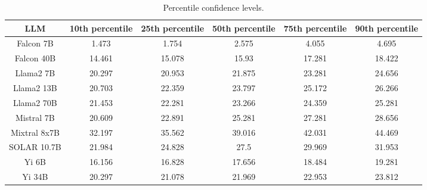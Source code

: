 \begin{table*}
\centering
\begin{tabular}{c|c|c|c|c|c}
LLM & 10th percentile & 25th percentile & 50th percentile & 75th percentile & 90th percentile\\ \hline
Falcon 7B & 1.473 & 1.754 & 2.575 & 4.055 & 4.695\\
Falcon 40B & 14.461 & 15.078 & 15.93 & 17.281 & 18.422\\
Llama2 7B & 20.297 & 20.953 & 21.875 & 23.281 & 24.656\\
Llama2 13B & 20.703 & 22.359 & 23.797 & 25.172 & 26.266\\
Llama2 70B & 21.453 & 22.281 & 23.266 & 24.359 & 25.281\\
Mistral 7B & 20.609 & 22.891 & 25.281 & 27.281 & 28.656\\
Mixtral 8x7B & 32.197 & 35.562 & 39.016 & 42.031 & 44.469\\
SOLAR 10.7B & 21.984 & 24.828 & 27.5 & 29.969 & 31.953\\
Yi 6B & 16.156 & 16.828 & 17.656 & 18.484 & 19.281\\
Yi 34B & 20.297 & 21.078 & 21.969 & 22.953 & 23.812\\
\hline
\end{tabular}
\caption{Percentile confidence levels.}
\label{tab:percentile_conf}
\end{table*}
